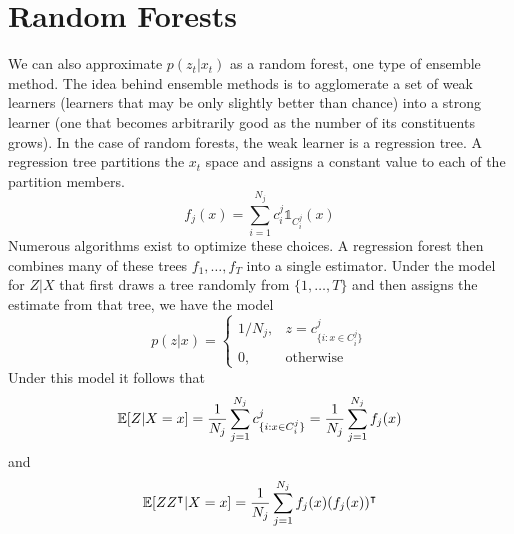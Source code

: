 \section{Random Forests} 
We can also approximate $p(z_t|x_t)$ as a random forest, one type of ensemble method.  The idea behind ensemble methods is to agglomerate a set of weak learners (learners that may be only slightly better than chance) into a strong learner (one that becomes arbitrarily good as the number of its constituents grows).  In the case of random forests, the weak learner is a regression tree.  A regression tree partitions the $x_t$ space and assigns a constant value to each of the partition members.  
\begin{equation}
f_j(x) = \sum_{i=1}^{N_j} c^j_i \mathds{1}_{C^j_i}(x)
\end{equation}
Numerous algorithms exist to optimize these choices.  A regression forest then combines many of these trees $f_1,\dotsc, f_T$ into a single estimator.  Under the model for $Z|X$ that first draws a tree randomly from $\{1,\dotsc,T\}$ and then assigns the estimate from that tree, we have the model
\begin{equation}
    p(z|x) = 
    \begin{cases} 1/N_j, & z=c_{\{i: x\in C_i^j\}}^j \\
    0, & \text{otherwise}
    \end{cases}
\end{equation}
Under this model it follows that
\begin{equation}
    \operatorname{\mathbb{E}}[Z|X=x] = \frac{1}{N_j} \sum_{j=1}^{N_j} c_{\{i: x\in C_i^j\}}^j = \frac{1}{N_j} \sum_{j=1}^{N_j} f_j(x)
\end{equation}
and
\begin{equation}
    \operatorname{\mathbb{E}}[ZZ^\intercal|X=x] = \frac{1}{N_j} \sum_{j=1}^{N_j} f_j(x)( f_j(x))^\intercal
\end{equation}

